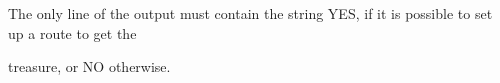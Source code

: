 The only line of the output must contain the string YES, if it is possible to set up a route to get the

treasure, or NO otherwise.

\